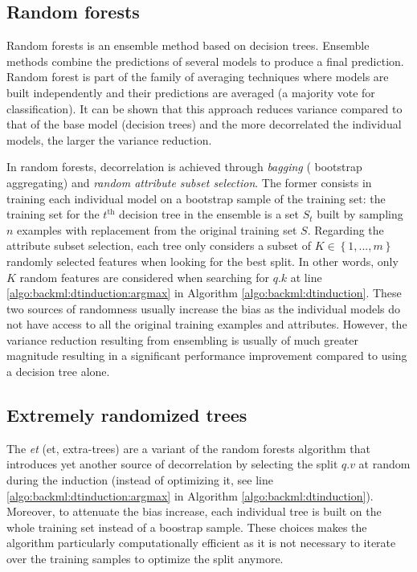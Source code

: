 \subsection{Random forests}
\label{ssec:backml:rf}

Random forests \cite{breiman2001random} is an ensemble method based on decision
trees. Ensemble methods combine the predictions of several models to produce a
final prediction. Random forest is part of the family of averaging techniques
where models are built independently and their predictions are averaged (\eg a
majority vote for classification). It can be shown that this approach reduces
variance compared to that of the base model (\eg decision trees) and the more
decorrelated the individual models, the larger the variance reduction.

In random forests, decorrelation is achieved through \textit{bagging} (\aka
bootstrap aggregating) and \textit{random attribute subset selection}. The former
consists in training each individual model on a bootstrap sample of the training
set: the training set for the $t^{\text{th}}$ decision tree in the ensemble is a
set $S_t$ built by sampling $n$ examples with replacement from the original training
set $S$. Regarding the attribute subset selection, each tree only considers a
subset of $K \in \left\{1,..., m\right\}$ randomly selected features when looking
for the best split. In other words, only $K$ random features are considered when
searching for $q.k$ at line \ref{algo:backml:dtinduction:argmax} in Algorithm
\ref{algo:backml:dtinduction}. These two sources of randomness usually increase
the bias as the individual models do not have access to all the original training
examples and attributes. However, the variance reduction resulting from ensembling
is usually of much greater magnitude resulting in a significant performance
improvement compared to using a decision tree alone.

\subsection{Extremely randomized trees}
\label{ssec:backml:et}

The \textit{\acrlong{et}} (\acrshort{et}, \aka extra-trees) \cite{geurts2006extremely}
are a variant of the random forests algorithm that introduces yet another source
of decorrelation by selecting the split $q.v$ at random during the induction
(instead of optimizing it, see line \ref{algo:backml:dtinduction:argmax} in
Algorithm \ref{algo:backml:dtinduction}). Moreover, to attenuate the bias increase,
each individual tree is built on the whole training set instead of a boostrap
sample. These choices makes the algorithm particularly computationally efficient
as it is not necessary to iterate over the training samples to optimize the split
anymore.

